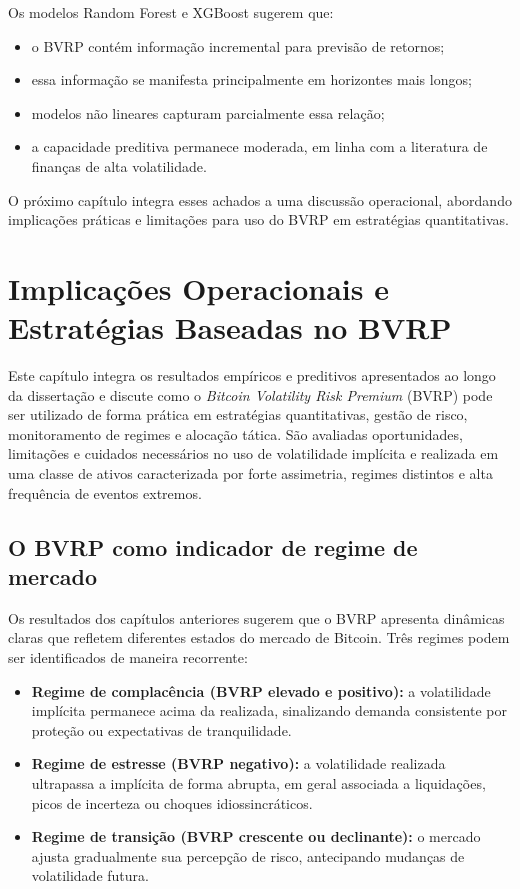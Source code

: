 Os modelos Random Forest e XGBoost sugerem que:

\begin{itemize}
    \item o BVRP contém informação incremental para previsão de retornos;
    \item essa informação se manifesta principalmente em horizontes mais longos;
    \item modelos não lineares capturam parcialmente essa relação;
    \item a capacidade preditiva permanece moderada, em linha com a literatura de
          finanças de alta volatilidade.
\end{itemize}

O próximo capítulo integra esses achados a uma discussão operacional, abordando
implicações práticas e limitações para uso do BVRP em estratégias quantitativas.

\chapter{Implicações Operacionais e Estratégias Baseadas no BVRP}
\label{chap:estrategias}

Este capítulo integra os resultados empíricos e preditivos apresentados ao longo
da dissertação e discute como o \textit{Bitcoin Volatility Risk Premium} (BVRP)
pode ser utilizado de forma prática em estratégias quantitativas, gestão de
risco, monitoramento de regimes e alocação tática. São avaliadas oportunidades,
limitações e cuidados necessários no uso de volatilidade implícita e realizada em
uma classe de ativos caracterizada por forte assimetria, regimes distintos e
alta frequência de eventos extremos.

\section{O BVRP como indicador de regime de mercado}

Os resultados dos capítulos anteriores sugerem que o BVRP apresenta dinâmicas
claras que refletem diferentes estados do mercado de Bitcoin. Três regimes
podem ser identificados de maneira recorrente:

\begin{itemize}
    \item \textbf{Regime de complacência (BVRP elevado e positivo):}  
          a volatilidade implícita permanece acima da realizada, sinalizando
          demanda consistente por proteção ou expectativas de tranquilidade.
    \item \textbf{Regime de estresse (BVRP negativo):}  
          a volatilidade realizada ultrapassa a implícita de forma abrupta, em
          geral associada a liquidações, picos de incerteza ou choques idiossincráticos.
    \item \textbf{Regime de transição (BVRP crescente ou declinante):}  
          o mercado ajusta gradualmente sua percepção de risco, antecipando
          mudanças de volatilidade futura.
\end{itemize}

